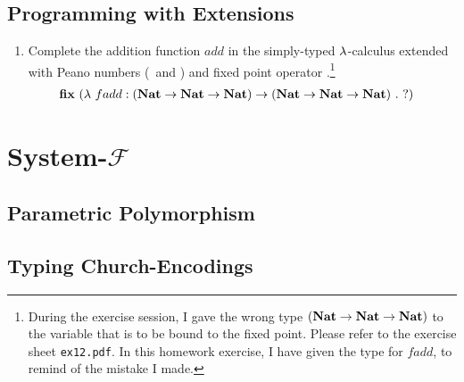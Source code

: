 \documentclass[a4paper,12pt]{article}
\begin{document}
\subsection{Programming with Extensions}

\begin{enumerate}
 \item Complete the addition function $add$ in the simply-typed $\lambda$-calculus extended with Peano numbers
  (\zero\ and \succ) and fixed point operator \fixp.\footnote{During the exercise session, I gave the wrong
  type $(\textbf{Nat} \rightarrow \textbf{Nat} \rightarrow \textbf{Nat})$ to the variable that is to be bound to the fixed point.  Please
  refer to the exercise sheet \texttt{ex12.pdf}.  In this homework exercise, I have given the type for
  $fadd$, to remind of the mistake I made.}
  \begin{align*}
   \textbf{fix}\ (& \lambda\ fadd : (\textbf{Nat} \rightarrow \textbf{Nat} \rightarrow \textbf{Nat}) \rightarrow (\textbf{Nat} \rightarrow \textbf{Nat} \rightarrow \textbf{Nat})\ .\ ?)
  \end{align*}
\end{enumerate}

\section{System-$\mathcal{F}$}

\subsection{Parametric Polymorphism}

\subsection{Typing Church-Encodings}
\end{document}

